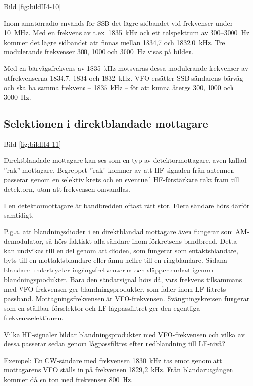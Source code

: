 Bild \ref{fig:bildII4-10}

Inom amatörradio används för SSB det lägre sidbandet vid frekvenser
under 10~MHz.  Med en frekvens av t.ex. 1835~kHz och ett talspektrum
av 300--3000~Hz kommer det lägre sidbandet att finnas mellan 1834,7 och
1832,0~kHz. Tre modulerande frekvenser 300, 1000 och 3000~Hz visas på
bilden.

Med en bärvågsfrekvens av 1835~kHz motsvaras dessa modulerande
frekvenser av utfrekvenserna 1834.7, 1834 och 1832~kHz. VFO ersätter
SSB-sändarens bärvåg och ska ha samma frekvens -- 1835~kHz -- för att
kunna återge 300, 1000 och 3000~Hz.

\subsection{Selektionen i direktblandade mottagare}

Bild \ref{fig:bildII4-11}

Direktblandade mottagare kan ses som en typ av detektormottagare, även
kallad ''rak'' mottagare. Begreppet ''rak'' kommer av att HF-signalen från
antennen passerar genom en selektiv krets och en eventuell
HF-förstärkare rakt fram till detektorn, utan att frekvensen omvandlas.

I en detektormottagare är bandbredden oftast rätt stor. Flera sändare
hörs därför samtidigt.

P.g.a. att blandningsdioden i en direktblandad mottagare även fungerar
som AM-demodulator, så hörs faktiskt alla sändare inom förkretsens
bandbredd. Detta kan undvikas till en del genom att dioden, som
fungerar som entaktsblandare, byts till en mottaktsblandare eller ännu
hellre till en ringblandare. Sådana blandare undertrycker
ingångsfrekvenserna och släpper endast igenom
blandningsprodukter. Bara den sändarsignal hörs då, vars frekvens
tillsammans med VFO-frekvensen ger blandningsprodukter, som faller
inom LF-filtrets passband. Mottagningsfrekvensen är
VFO-frekvensen. Svängningskretsen fungerar som en ställbar förselektor
och LF-lågpassfiltret ger den egentliga frekvensselektionen.

Vilka HF-signaler bildar blandningsprodukter med VFO-frekvensen och
vilka av dessa passerar sedan genom lågpassfiltret efter nedblandning
till LF-nivå?

Exempel: En CW-sändare med frekvensen 1830~kHz tas emot genom att
mottagarens VFO ställs in på frekvensen 1829,2~kHz. Från
blandarutgången kommer då en ton med frekvensen 800~Hz.

